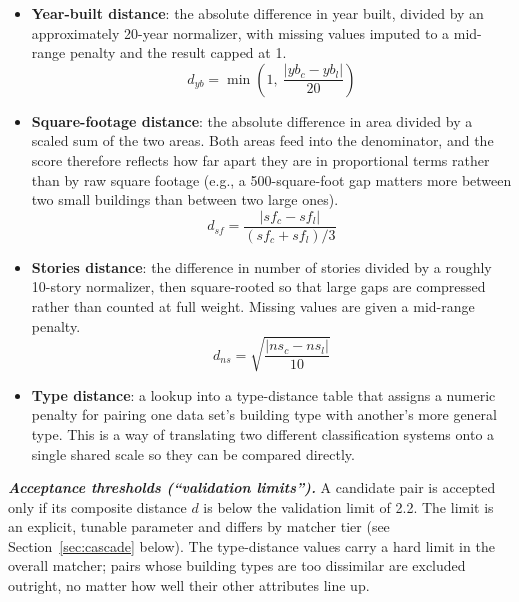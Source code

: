 \begin{itemize}
  \item \textbf{Year-built distance}: the absolute difference in year built, divided by an approximately 20-year normalizer, with missing values imputed to a mid-range penalty and the result capped at 1.
  \begin{equation}
    d_{yb} = \min\!\left(1,\ \frac{\lvert yb_{c} - yb_{l} \rvert}{20}\right)
    \label{eq:d-yb}
  \end{equation}

  \item \textbf{Square-footage distance}: the absolute difference in area divided by a scaled sum of the two areas. Both areas feed into the denominator, and the score therefore reflects how far apart they are in proportional terms rather than by raw square footage (e.g., a 500-square-foot gap matters more between two small buildings than between two large ones).
  \begin{equation}
    d_{sf} = \frac{\lvert sf_{c} - sf_{l} \rvert}{(sf_{c} + sf_{l})/3}
    \label{eq:d-sf}
  \end{equation}

  \item \textbf{Stories distance}: the difference in number of stories divided by a roughly 10-story normalizer, then square-rooted so that large gaps are compressed rather than counted at full weight. Missing values are given a mid-range penalty.
  \begin{equation}
    d_{ns} = \sqrt{\frac{\lvert ns_{c} - ns_{l} \rvert}{10}}
    \label{eq:d-ns}
  \end{equation}

  \item \textbf{Type distance}: a lookup into a type-distance table that assigns a numeric penalty for pairing one data set's building type with another's more general type. This is a way of translating two different classification systems onto a single shared scale so they can be compared
  directly.
\end{itemize}

\textbf{\textit{Acceptance thresholds (``validation limits'').}} A candidate pair is accepted only if its composite distance $d$ is below the validation limit of 2.2. The limit is an explicit, tunable parameter and differs by matcher tier (see Section~\ref{sec:cascade} below). The type-distance values carry a hard limit in the overall matcher; pairs whose building types are too dissimilar are excluded outright, no matter how well their other attributes line up.

